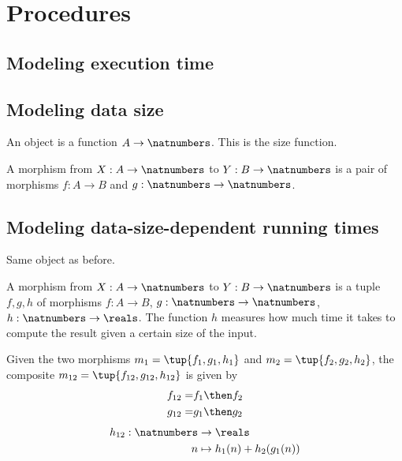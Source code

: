 
\section{Procedures}



\subsection{Modeling execution time}


\subsection{Modeling data size}

An object is a function $A \to \natnumbers $. This is the size function.


A morphism from $X: A \to \natnumbers $ to $Y: B \to \natnumbers$ is a pair of morphisms
$f: A \to B$ and $g: \natnumbers \to \natnumbers$.



\subsection{Modeling data-size-dependent running times}

Same object as before.


A morphism from $X: A \to \natnumbers $ to $Y: B \to \natnumbers$ is a tuple $f, g, h$ of morphisms
$f: A \to B$, $g: \natnumbers \to \natnumbers$, $h: \natnumbers \to \reals$. The function $h$ measures
how much time it takes to compute the result given a certain size of the input.

Given the two morphisms $m_1 = \tup{f_1, g_1, h_1}$ and $m_2 = \tup{f_2, g_2, h_2}$, the composite
$m_{12} = \tup{f_{12}, g_{12}, h_{12}}$ is given by
%
\begin{eqnarray}
 f_{12} =& f_1 \then f_2 \\
 g_{12} =& g_1 \then g_2 \\
\end{eqnarray}
%
\begin{eqnarray}
 h_{12} : \natnumbers & \to \reals \\
   n & \mapsto h_1(n) + h_2( g_1 (n))
\end{eqnarray}
